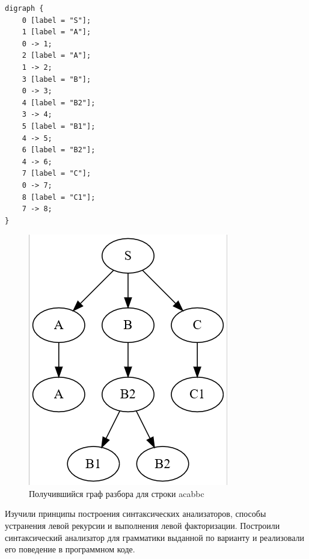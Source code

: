 \begin{lstlisting}[caption=Пример вывода программы для строки acabbc, label=lst:sa-output]
digraph {
    0 [label = "S"];
    1 [label = "A"];
    0 -> 1;
    2 [label = "A"];
    1 -> 2;
    3 [label = "B"];
    0 -> 3;
    4 [label = "B2"];
    3 -> 4;
    5 [label = "B1"];
    4 -> 5;
    6 [label = "B2"];
    4 -> 6;
    7 [label = "C"];
    0 -> 7;
    8 [label = "C1"];
    7 -> 8;
}
\end{lstlisting}


\begin{figure}
    \centering
    \includegraphics[width=0.5\linewidth]{res/graph.png}
    \caption{Получившийся граф разбора для строки acabbc}
    \label{fig:sa-graph}
\end{figure}


Изучили принципы построения синтаксических анализаторов, способы устранения левой рекурсии и выполнения левой факторизации. Построили синтаксический анализатор для  грамматики выданной по варианту и реализовали его поведение в программном коде.  





